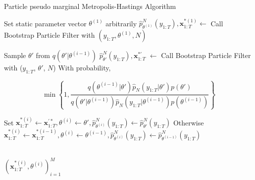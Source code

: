 \documentclass[11pt,a4,twosided,singlespacing,titlepagenumber=on]{scrreprt}
\numberwithin{equation}{chapter} %
\theoremstyle{remark}
\newcommand{\matr}[1]{\mathbf{#1}}
\begin{document}
\begin{algorithm}[H]
\caption{Particle pseudo marginal Metropolis-Hastings Algorithm}\label{algo_pmcmc}
\begin{algorithmic}[1]
\State Set static parameter vector $\theta^{(1)}$ arbitrarily
\State $\hat{p}^N_{\theta^{(1)}}(y_{1:T}), \matr{x}^{*(1)}_{1:T} \gets$ Call Bootstrap Particle Filter with $(y_{1:T}, \theta^{(1)}, N)$

	\State Sample $\theta'$ from $q(\theta'|\theta^{(i-1)})$
	\State $\hat{p}^N_{\theta'}(y_{1:T}), \matr{x}^{*'}_{1:T}$ $ \gets$ Call Bootstrap Particle Filter with ($y_{1:T}$, $\theta'$, $N$)
	\State With probability,
	
	$$\min \left\{1, \frac{q(\theta^{(i-1)}|\theta')\hat{p}_N(y_{1:T}|\theta')p(\theta')}{q(\theta'|\theta^{(i-1)})\hat{p}_N(y_{1:T}|\theta^{(i-1)})p(\theta^{(i-1)})}  \right\} $$
	
	\State Set $\matr{x}^{*(i)}_{1:T} \gets \matr{x}^{'*}_{1:T},\theta^{(i)} \gets \theta', \hat{p}^N_{\theta^{(i)}}(y_{1:T}) \gets \hat{p}^N_{\theta'}(y_{1:T})$
	\State Otherwise $\matr{x}^{*(i)}_{1:T} \gets \matr{x}^{*(i-1)}_{1:T},\theta^{(i)} \gets \theta^{(i-1)}, \hat{p}^N_{\theta^{(i)}}(y_{1:T}) \gets \hat{p}^N_{\theta^{(i-1)}}(y_{1:T})$
	
\\
\EndProcedure
\Return $(\matr{x}^{*(i)}_{1:T}, \theta^{(i)})_{i=1}^M$

\end{algorithmic}
\end{algorithm}
\end{document}
